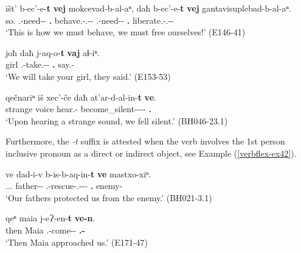 \begin{exe}
	\ex\label{verbflex-ex41}
	\begin{xlist}
		
		
			\ex\label{verbflex-ex41a}
			\gll išt' b-ec'-e-\textbf{t} \textbf{vej} mokcevad-b-al-aⁿ, daħ b-ec'-e-\textbf{t} \textbf{vej} gantavisuplebad-b-al-aⁿ.\\
			so.{\Prox} {\M}.{\Pl}-need-{\Npst}-\textbf{{\Pl}} \textbf{{\Fpl}.{\Incl}} behave.{\Pfv}-{\M}.{\Pl}-{\Intr}-{\Inf} {\Pv} {\M}.{\Pl}-need-{\Npst}-\textbf{{\Pl}} \textbf{{\Fpl}.{\Incl}} liberate.{\Pfv}-{\M}.{\Pl}-{\Intr}-{\Inf} \\
			\trans `This is how we must behave, we must free ourselves!'
			\hfill  (E146-41)
		
		
		
			\ex\label{verbflex-ex41b}
			\gll  joħ daħ j-aq-o-\textbf{t} \textbf{vaj} aɬ-iⁿ. \\
			girl {\Pv} {\F}.{\Sg}-take.{\Pfv}-{\Npst}-\textbf{{\Pl}} \textbf{{\Fpl}.{\Incl}} say.{\Pfv}-{\Aor} \\
			\trans `We will take your girl, they said.'
			\hfill (E153-53)
		
		
		
			\ex\label{verbflex-ex41c}
			\gll  qečnariⁿ iš xec'-če daħ at'ar-d-al-in-\textbf{t} \textbf{ve}. \\
			strange voice hear.{\Pfv}-{\Ante} {\Pv} become\_silent-{\D}-{\Intr}-{\Aor}-\textbf{{\Pl}} \textbf{{\Fpl}.{\Incl}} \\
			\trans `Upon hearing a strange sound, we fell silent.'
			\hfill (BH046-23.1)
		
		
	\end{xlist}
\end{exe}

Furthermore, the \textit{-t} suffix is attested when the verb involves the 1st person inclusive pronoun as a direct or indirect object, see Example (\ref{verbflex-ex42}).

\begin{exe}
	\ex\label{verbflex-ex42}
	\begin{xlist}
		
		
			\ex\label{verbflex-ex42a}
			\gll ve dad-i-v b-is-b-aq-in-\textbf{t} \textbf{ve} mastxo-xiⁿ. \\
			{\Fpl}.{\Incl}.{\Poss}.{\Obl} father-{\Pl}-{\Erg} {\M}.{\Pl}-rescue-{\M}.{\Pl}-{\Lv}-{\Aor}-\textbf{{\Pl}} \textbf{{\Fpl}.{\Incl}} enemy-{\Apudabl} \\
			\trans `Our fathers protected us from the enemy.'
			\hfill (BH021-3.1)
		
		
		
			\ex\label{verbflex-ex42b}
			\gll qeⁿ maia j-eɁ-en-\textbf{t} \textbf{ve-n}. \\
			then Maia {\F}.{\Sg}-come-{\Aor}-\textbf{{\Pl}} \textbf{{\Fpl}.{\Incl}-{\Dat}}\\
			\trans `Then Maia approached us.'
			\hfill (E171-47)
		
		
	\end{xlist}
\end{exe}



